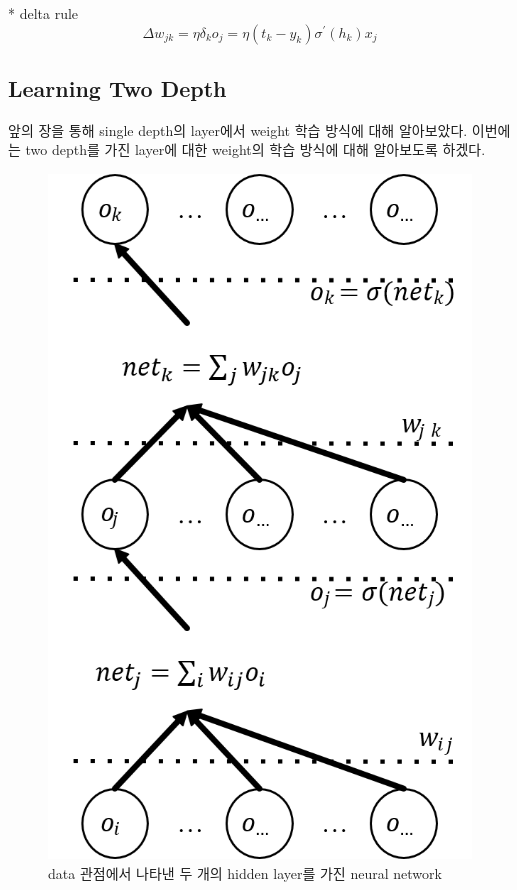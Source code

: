 \documentclass[draft=false]{oblivoir}
\begin{document}
* delta rule
\begin{equation}
\Delta w_{jk} = \eta\delta_{k}o_{j}=\eta(t_{k}-y_{k})\sigma^{'}(h_{k})x_{j}
\end{equation}

\subsection{Learning Two Depth}
앞의 장을 통해 single depth의 layer에서 weight 학습 방식에 대해 알아보았다. 이번에는 two depth를 가진 layer에 대한 weight의 학습 방식에 대해 알아보도록 하겠다. 

\begin{figure}[ht] \centering 
\includegraphics[scale=0.5]{fig14_20.png} 
\caption{data 관점에서 나타낸 두 개의 hidden layer를 가진 neural network}
\label{fig:14-20}
\end{figure}
\end{document}
